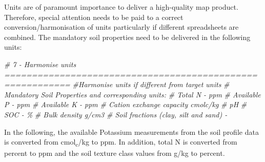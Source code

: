 \documentclass[
  10pt,
  b5paper,
  oneside]{book}
\newenvironment{Shaded}{\begin{snugshade}}{\end{snugshade}}
\newcommand{\CommentTok}[1]{\textcolor[rgb]{0.56,0.35,0.01}{\textit{#1}}}
\newcommand{\DecValTok}[1]{\textcolor[rgb]{0.00,0.00,0.81}{#1}}
\newcommand{\FloatTok}[1]{\textcolor[rgb]{0.00,0.00,0.81}{#1}}
\newcommand{\FunctionTok}[1]{\textcolor[rgb]{0.00,0.00,0.00}{#1}}
\newcommand{\NormalTok}[1]{#1}
\newcommand{\OtherTok}[1]{\textcolor[rgb]{0.56,0.35,0.01}{#1}}
\newcommand{\SpecialCharTok}[1]{\textcolor[rgb]{0.00,0.00,0.00}{#1}}
\begin{document}
Units are of paramount importance to deliver a high-quality map product. Therefore, special attention needs to be paid to a correct conversion/harmonisation of units particularly if different spreadsheets are combined. The mandatory soil properties need to be delivered in the following units:

\begin{Shaded}
\begin{Highlighting}[]
\CommentTok{\# 7 {-} Harmonise units ==========================================================}
\CommentTok{\#Harmonise units if different from target units}
\CommentTok{\# Mandatory Soil Properties and corresponding units:}
\CommentTok{\# Total N {-} ppm}
\CommentTok{\# Available P {-} ppm}
\CommentTok{\# Available K {-} ppm}
\CommentTok{\# Cation exchange capacity cmolc/kg}
\CommentTok{\# pH}
\CommentTok{\# SOC {-} \%}
\CommentTok{\# Bulk density g/cm3}
\CommentTok{\# Soil fractions (clay, silt and sand) {-} }
\end{Highlighting}
\end{Shaded}

In the following, the available Potassium measurements from the soil profile data is converted from cmol\textsubscript{c}/kg to ppm. In addition, total N is converted from percent to ppm and the soil texture class values from g/kg to percent.

\begin{Shaded}
\end{Shaded}
\end{document}
